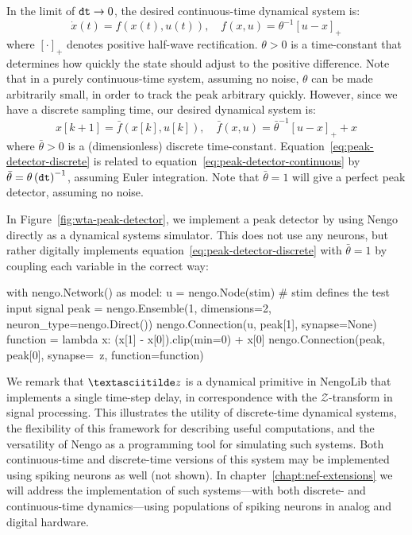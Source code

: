 
In the limit of $\texttt{dt}{} \rightarrow 0$, the desired continuous-time dynamical system is:
\begin{equation}
\label{eq:peak-detector-continuous}
\dot{x}(t) = f(x(t), u(t)), \quad f(x, u) = \theta^{-1} \left[u - x \right]_+
\end{equation}
where $\left[ \cdot \right]_+$ denotes positive half-wave rectification. $\theta > 0$ is a time-constant that determines how quickly the state should adjust to the positive difference. Note that in a purely continuous-time system, assuming no noise, $\theta$ can be made arbitrarily small, in order to track the peak arbitrary quickly. 
However, since we have a discrete sampling time, our desired dynamical system is:
\begin{equation}
\label{eq:peak-detector-discrete}
x[k + 1] = \bar{f}(x[k], u[k]), \quad \bar{f}(x, u) = \bar{\theta}^{-1} \left[u - x \right]_+ + x
\end{equation}
where $\bar{\theta} > 0 $ is a (dimensionless) discrete time-constant.
Equation~\ref{eq:peak-detector-discrete} is related to equation~\ref{eq:peak-detector-continuous} by $\bar{\theta} = \theta \left( \texttt{dt}{} \right)^{-1}$, assuming Euler integration.
Note that $\bar{\theta} = 1$ will give a perfect peak detector, assuming no noise.

In Figure~\ref{fig:wta-peak-detector}, we implement a peak detector by using Nengo directly as a dynamical systems simulator. This does not use any neurons, but rather digitally implements equation~\ref{eq:peak-detector-discrete} with $\bar{\theta} = 1$ by coupling each variable in the correct way:
\begin{python}
with nengo.Network() as model:
    u = nengo.Node(stim)  # stim defines the test input signal
    peak = nengo.Ensemble(1, dimensions=2, neuron_type=nengo.Direct())
    nengo.Connection(u, peak[1], synapse=None)
    function = lambda x: (x[1] - x[0]).clip(min=0) + x[0]
    nengo.Connection(peak, peak[0], synapse=~z, function=function)
\end{python}
We remark that $\textasciitilde z$ is a dynamical primitive in NengoLib that implements a single time-step delay, in correspondence with the $\mathcal{Z}$-transform in signal processing.
This illustrates the utility of discrete-time dynamical systems, the flexibility of this framework for describing useful computations, and the versatility of Nengo as a programming tool for simulating such systems.
Both continuous-time and discrete-time versions of this system may be implemented using spiking neurons as well (not shown).
In chapter~\ref{chapt:nef-extensions} we will address the implementation of such systems---with both discrete- and continuous-time dynamics---using populations of spiking neurons in analog and digital hardware.

